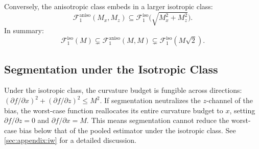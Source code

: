 Conversely, the anisotropic class embeds in a larger isotropic class:
\begin{equation}\label{eq:aniso_subset_iso}
	\mathcal{F}_1^{\mathrm{aniso}}(M_x, M_z) \subseteq \mathcal{F}_1^{\mathrm{iso}}\!\bigl(\sqrt{M_x^2 + M_z^2}\bigr).
\end{equation}
In summary:
\begin{equation*}
	\mathcal{F}_1^{\mathrm{iso}}(M) \subsetneq \mathcal{F}_1^{\mathrm{aniso}}(M, M) \subsetneq \mathcal{F}_1^{\mathrm{iso}}(M\sqrt{2}).
\end{equation*}


\subsection*{Segmentation under the Isotropic Class}

Under the isotropic class, the curvature budget is fungible across directions: $(\partial f / \partial x)^2 + (\partial f / \partial z)^2 \leq M^2$.
If segmentation neutralizes the $z$-channel of the bias, the worst-case function reallocates its entire curvature budget to $x$, setting $\partial f / \partial z = 0$ and $\partial f / \partial x = M$.
This means segmentation cannot reduce the worst-case bias below that of the pooled estimator under the isotropic class.
See \cref{sec:appendix:iw} for a detailed discussion.
